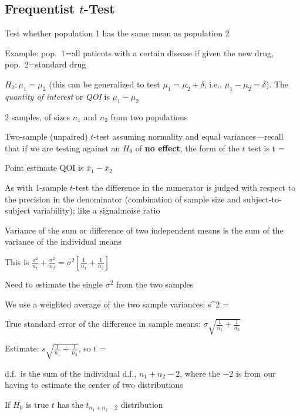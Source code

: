 \subsection{Frequentist $t$-Test}
\bi
\item Test whether population 1 has the same mean as population 2
\item Example: pop.\ 1=all patients with a certain disease if given
  the new drug, pop.\ 2=standard drug
\item $H_{0}: \mu_{1}=\mu_{2}$ (this can be generalized to test
  $\mu_{1}=\mu_{2}+\delta$, i.e., $\mu_{1}-\mu_{2}=\delta$).  The
  \emph{quantity of interest} or \emph{QOI} is $\mu_{1}-\mu_{2}$
\item 2 samples, of sizes $n_{1}$ and $n_{2}$ from two populations
\item Two-sample (unpaired) $t$-test assuming normality and equal
variances---recall that if we are testing against an $H_0$ of
\textbf{no effect}, the form of the $t$ test is
\beq
t =
\eeq
\item Point estimate QOI is $\bar{x}_{1} - \bar{x}_{2}$
\item As with 1-sample $t$-test the difference in the numerator is judged with respect to the precision in the denominator (combination of sample size and subject-to-subject variability); like a signal:noise ratio
\item Variance of the sum or difference of two independent means is
  the sum of the variance of the individual means
\item This is $\frac{\sigma^{2}}{n_{1}} + \frac{\sigma^{2}}{n_{2}} =
  \sigma^{2}[\frac{1}{n_{1}} + \frac{1}{n_{2}}]$
\item Need to estimate the single $\sigma^{2}$ from the two samples
\item We use a weighted average of the two sample variances:
\beq
s^{2} = 
\eeq
\item True standard error of the difference in sample means: $\sigma
  \sqrt{\frac{1}{n_{1}} + \frac{1}{n_{2}}}$
\item Estimate: $s \sqrt{\frac{1}{n_{1}} + \frac{1}{n_{2}}}$, so
\beq
t = 
\eeq
\item d.f.\ is the sum of the individual d.f., $n_{1}+n_{2}-2$, where
  the $-2$ is from our having to estimate the center of two
  distributions
\item If $H_{0}$ is true $t$ has the $t_{n_{1}+n_{2}-2}$ distribution
